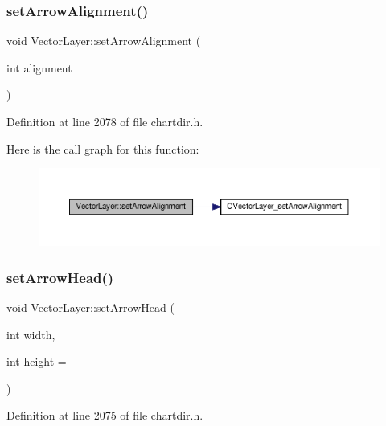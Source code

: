 \subsubsection{\texorpdfstring{set\+Arrow\+Alignment()}{setArrowAlignment()}}
{\footnotesize\ttfamily void Vector\+Layer\+::set\+Arrow\+Alignment (\begin{DoxyParamCaption}\item[{int}]{alignment }\end{DoxyParamCaption})\hspace{0.3cm}{\ttfamily [inline]}}



Definition at line 2078 of file chartdir.\+h.

Here is the call graph for this function\+:
\nopagebreak
\begin{figure}[H]
\begin{center}
\leavevmode
\includegraphics[width=350pt]{class_vector_layer_a9911f09f935feef10db4d5f16c6ba605_cgraph}
\end{center}
\end{figure}
\mbox{\label{class_vector_layer_af42ed822026b94b28c4d154018eb9a1f}} 
\subsubsection{\texorpdfstring{set\+Arrow\+Head()}{setArrowHead()}\hspace{0.1cm}{\footnotesize\ttfamily [1/2]}}
{\footnotesize\ttfamily void Vector\+Layer\+::set\+Arrow\+Head (\begin{DoxyParamCaption}\item[{int}]{width,  }\item[{int}]{height = {} }\end{DoxyParamCaption})\hspace{0.3cm}{\ttfamily [inline]}}



Definition at line 2075 of file chartdir.\+h.

